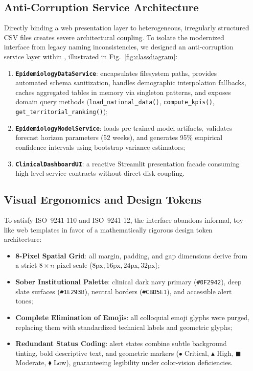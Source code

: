 \documentclass[conference]{IEEEtran}
\begin{document}
\subsection{Anti-Corruption Service Architecture}

Directly binding a web presentation layer to heterogeneous, irregularly structured CSV files creates severe architectural coupling. To isolate the modernized interface from legacy naming inconsistencies, we designed an anti-corruption service layer within , illustrated in Fig.~\ref{fig:classdiagram}:
\begin{enumerate}
  \item \textbf{\texttt{EpidemiologyDataService}}: encapsulates filesystem paths, provides automated schema sanitization, handles demographic interpolation fallbacks, caches aggregated tables in memory via singleton patterns, and exposes domain query methods (\texttt{load\_national\_data()}, \texttt{compute\_kpis()}, \texttt{get\_territorial\_ranking()});
  \item \textbf{\texttt{EpidemiologyModelService}}: loads pre-trained model artifacts, validates forecast horizon parameters (52 weeks), and generates 95\% empirical confidence intervals using bootstrap variance estimators;
  \item \textbf{\texttt{ClinicalDashboardUI}}: a reactive Streamlit presentation facade consuming high-level service contracts without direct disk coupling.
\end{enumerate}

\subsection{Visual Ergonomics and Design Tokens}

To satisfy ISO~9241-110 and ISO~9241-12, the interface abandons informal, toy-like web templates in favor of a mathematically rigorous design token architecture:
\begin{itemize}
  \item \textbf{8-Pixel Spatial Grid}: all margin, padding, and gap dimensions derive from a strict $8\times n$ pixel scale ($8\text{px}, 16\text{px}, 24\text{px}, 32\text{px}$);
  \item \textbf{Sober Institutional Palette}: clinical dark navy primary (\texttt{\#0F2942}), deep slate surfaces (\texttt{\#1E293B}), neutral borders (\texttt{\#CBD5E1}), and accessible alert tones;
  \item \textbf{Complete Elimination of Emojis}: all colloquial emoji glyphs were purged, replacing them with standardized technical labels and geometric glyphs;
  \item \textbf{Redundant Status Coding}: alert states combine subtle background tinting, bold descriptive text, and geometric markers ($\bullet$ Critical, $\blacktriangle$ High, $\blacksquare$ Moderate, $\blacklozenge$ Low), guaranteeing legibility under color-vision deficiencies.
\end{itemize}
\end{document}
